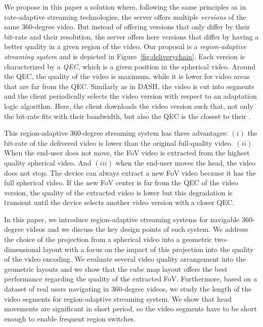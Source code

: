 We propose in this paper a solution where, following the same principles as in
rate-adaptive streaming technologies, the server offers multiple \emph{versions} of the same
360-degree video. But instead of offering versions that only differ by
their bit-rate and their resolution, the server offers here versions that differ by
having a better quality in a given region of the video.
Our proposal is a \emph{region-adaptive streaming system} and is depicted in
Figure~\ref{fig:deliverychain}.
Each version is characterized by a \emph{\ac{QEC}}, which is a given
position in the spherical video. Around the \ac{QEC}, the quality of the video is maximum,
while it is lower for video areas that are far from the \ac{QEC}. Similarly as
in \ac{DASH}, the video is cut into segments and the client periodically selects
the video version with respect to an adaptation logic algorithm. Here, the client downloads
the video version
such that, not only the bit-rate fits with their bandwidth, but also
the \ac{QEC} is the closest to their .



This region-adaptive 360-degree streaming system has three advantages:
$(i)$ the bit-rate of the delivered video is lower than the original full-quality video.
$(ii)$ When the end-user does not move, the \ac{FoV} video is extracted from the highest
quality spherical video.
And $(iii)$ when the end-user moves the head, the video does not stop. The device can
always extract
a new \ac{FoV} video because it has the full spherical video. If the
new \ac{FoV} center is far from the
\ac{QEC} of the video version, the quality of the extracted video is lower but this
degradation is transient until the
device selects another video version with a closer \ac{QEC}.

In this paper, we introduce region-adaptive streaming systems for navigable 360-degree
videos and we discuss the key design points of such system. We address
the choice of the projection from a spherical video into a geometric two-dimensional layout
with a focus on the impact of this projection into the quality of the video encoding. We evaluate
several video quality arrangement into the geometric layouts and we show that the
cube map layout offers the best performance regarding the quality of the extracted
\ac{FoV}.
Furthermore, based on a dataset of
real users navigating in 360-degree videos, we study the length of the video segments
for region-adaptive streaming system. We show that head movements are significant
in short period, so the video segments have to be short enough to enable
frequent region switches.

